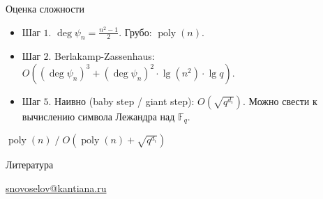 \documentclass{beamer}
\begin{document}
\begin{frame}{Оценка сложности}
    \begin{itemize}
        \item Шаг $1$. $\deg \psi_n = \frac{n^2 - 1}{2}$. Грубо: $\operatorname{poly}(n)$. \\
        \item Шаг $2$. Berlakamp-Zassenhaus: $O( (\deg \psi_n)^3 + (\deg \psi_n)^2 \cdot \operatorname{lg}(n^2) \cdot \operatorname{lg}q  )$.\\
        \item Шаг $5$. Наивно (baby step / giant step): $O(\sqrt{q^{d_i}})$. Можно свести к вычислению символа Лежандра над $\mathbb{F}_q$.
    \end{itemize}
     $\operatorname{poly}(n) \;/\; O(\operatorname{poly}(n) + \sqrt{q^{d_i}})$
\end{frame}

\begin{frame}{Литература}
    \nocite{Washington2008}
    \nocite{Lang1978}
    \nocite{vanTuyl1997}
    \printbibliography
    
    \begin{center}
        \begin{tcolorbox}[enhanced,hbox,colback=block-green-color-bg,colframe=subsection-color!120,title=Контакты,center title]
            \begin{varwidth}{\textwidth}
                \begin{center}
                    \href{mailto:snovoselov@kantiana.ru}{snovoselov@kantiana.ru}
                \end{center}
            \end{varwidth}
        \end{tcolorbox}	
    \end{center}
\end{frame}
\end{document}
